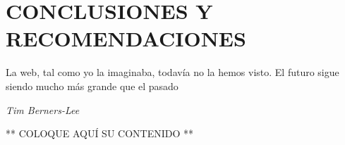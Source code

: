 \chapter*{CONCLUSIONES Y RECOMENDACIONES}
\thispagestyle{empty}

\renewcommand{\thefigure}{C.\arabic{figure}}
\setcounter{figure}{0}

\epigraph{\flushright La web, tal como yo la imaginaba, todavía no la hemos visto. El futuro sigue siendo mucho más grande que el pasado}{\textit{Tim Berners-Lee}}

** COLOQUE AQUÍ SU CONTENIDO **